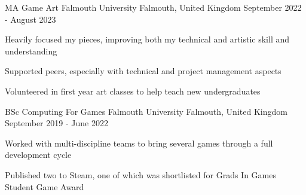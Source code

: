 \begin{cventries}
  \cventry
  {MA Game Art}
  {Falmouth University}
  {Falmouth, United Kingdom}
  {September 2022 - August 2023}
  {
    \begin{cvitems}
      \item Heavily focused my pieces, improving both my technical and artistic skill and understanding
      \item Supported peers, especially with technical and project management aspects
      \item Volunteered in first year art classes to help teach new undergraduates
    \end{cvitems}
  }

  \cventry
    {BSc Computing For Games} %
    {Falmouth University} %
    {Falmouth, United Kingdom} %
    {September 2019 - June 2022} %
    {
      \begin{cvitems} %
        \item Worked with multi-discipline teams to bring several games through a full development cycle
        \item Published two to Steam, one of which was shortlisted for Grads In Games Student Game Award
      \end{cvitems}
    }
\end{cventries}
